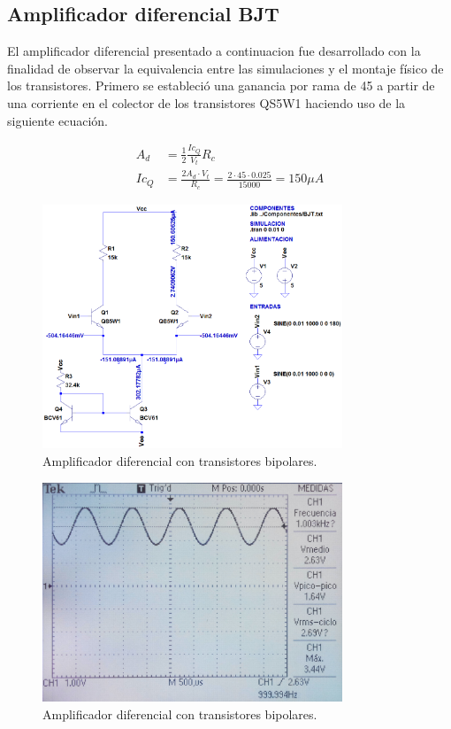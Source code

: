 \subsection{Amplificador diferencial BJT}
El amplificador diferencial presentado a continuacion fue desarrollado con la finalidad de observar la equivalencia entre las simulaciones y el montaje físico de los transistores.
Primero se estableció una ganancia por rama de 45 a partir de una corriente en el colector de los transistores QS5W1 haciendo uso de la siguiente ecuación.

\begin{align} \label{vfs}
A_d  &= \frac{1}{2}\frac{Ic_Q}{V_t}R_c \\ 
Ic_Q &= \frac{2A_d\cdot V_t}{R_c} = \frac{2\cdot45\cdot0.025}{15000} = 150 \mu A
\end{align}

\begin{figure}[H]
  \centering
  \includegraphics[width=0.8\textwidth]{Capitulo_2/ampdifbjt.png}
  \caption{Amplificador diferencial con transistores bipolares.}
  \label{ampdifbjt} 
\end{figure}

\begin{figure}[H]
  \centering
  \includegraphics[width=0.8\textwidth]{Capitulo_2/lab_ampdifbjt.png}
  \caption{Amplificador diferencial con transistores bipolares.}
  \label{ampdifbjt} 
\end{figure}

